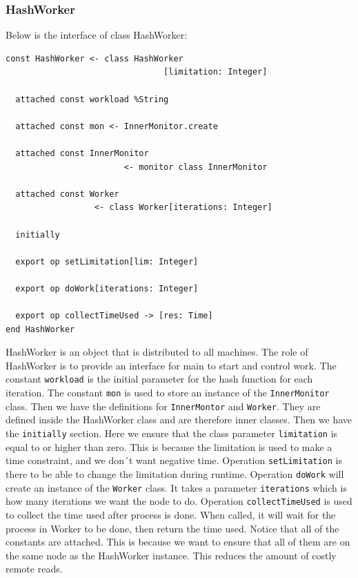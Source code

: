 \subsubsection{HashWorker}
Below is the interface of class HashWorker:
\begin{lstlisting}[language=emerald]
const HashWorker <- class HashWorker
                                [limitation: Integer]
  
  attached const workload %String

  attached const mon <- InnerMonitor.create

  attached const InnerMonitor 
                        <- monitor class InnerMonitor

  attached const Worker
                  <- class Worker[iterations: Integer]

  initially

  export op setLimitation[lim: Integer]
  
  export op doWork[iterations: Integer]

  export op collectTimeUsed -> [res: Time]
end HashWorker
\end{lstlisting}
HashWorker is an object that is distributed to all machines. The role of HashWorker is to provide an interface for main to start and control work. The constant \verb|workload| is the initial parameter for the hash function for each iteration. The constant \verb|mon| is used to store an instance of the \verb|InnerMonitor| class. Then we have the definitions for \verb|InnerMontor| and \verb|Worker|. They are defined inside the HashWorker class and are therefore inner classes. Then we have the \verb|initially| section. Here we ensure that the class parameter \verb|limitation| is equal to or higher than zero. This is because the limitation is used to make a time constraint, and we don´t want negative time. Operation \verb|setLimitation| is there to be able to change the limitation during runtime. Operation \verb|doWork| will create an instance of the \verb|Worker| class. It takes a parameter \verb|iterations| which is how many iterations we want the node to do. Operation \verb|collectTimeUsed| is used to collect the time used after process is done. When called, it will wait for the process in Worker to be done, then return the time used.
Notice that all of the constants are attached. This is because we want to ensure that all of them are on the same node as the HashWorker instance. This reduces the amount of costly remote reads.





